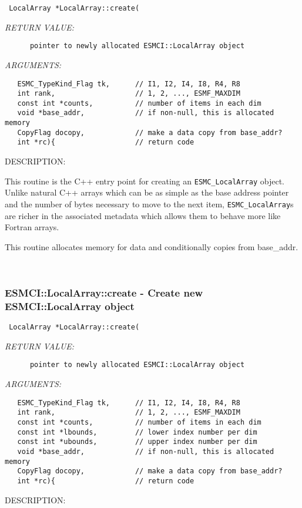   
\begin{verbatim} LocalArray *LocalArray::create(\end{verbatim}{\em RETURN VALUE:}
\begin{verbatim}      pointer to newly allocated ESMCI::LocalArray object\end{verbatim}{\em ARGUMENTS:}
\begin{verbatim}   ESMC_TypeKind_Flag tk,      // I1, I2, I4, I8, R4, R8
   int rank,                   // 1, 2, ..., ESMF_MAXDIM
   const int *counts,          // number of items in each dim
   void *base_addr,            // if non-null, this is allocated memory
   CopyFlag docopy,            // make a data copy from base_addr?
   int *rc){                   // return code\end{verbatim}
{\sf DESCRIPTION:\\ }


    This routine is the C++ entry point for creating an {\tt ESMC\_LocalArray}
    object.  Unlike natural C++ arrays which can be as simple as the
    base address pointer and the number of bytes necessary to move to
    the next item, {\tt ESMC\_LocalArray}s are richer in the associated metadata
    which allows them to behave more like Fortran arrays.
  
    This routine allocates memory for data and conditionally copies from
    base_addr.
   
 
\mbox{}\hrulefill\
 
\subsubsection [ESMCI::LocalArray::create] {ESMCI::LocalArray::create - Create new ESMCI::LocalArray object}


  
\begin{verbatim} LocalArray *LocalArray::create(\end{verbatim}{\em RETURN VALUE:}
\begin{verbatim}      pointer to newly allocated ESMCI::LocalArray object\end{verbatim}{\em ARGUMENTS:}
\begin{verbatim}   ESMC_TypeKind_Flag tk,      // I1, I2, I4, I8, R4, R8
   int rank,                   // 1, 2, ..., ESMF_MAXDIM
   const int *counts,          // number of items in each dim
   const int *lbounds,         // lower index number per dim
   const int *ubounds,         // upper index number per dim
   void *base_addr,            // if non-null, this is allocated memory
   CopyFlag docopy,            // make a data copy from base_addr?
   int *rc){                   // return code\end{verbatim}
{\sf DESCRIPTION:\\ }


